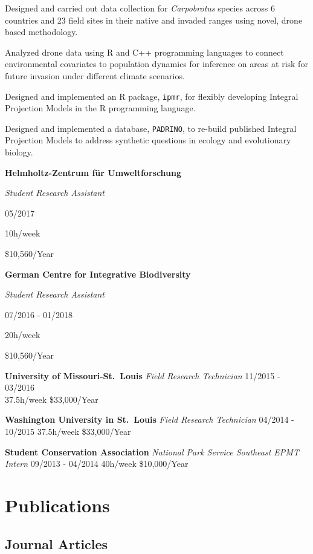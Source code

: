 \documentclass[11pt,]{article}
\renewenvironment{itemize}{
  \begin{list}{}{
    \setlength{\leftmargin}{1.5em}
  }
}{
  \end{list}
}
\begin{document}
\begin{itemize}
\item
  Designed and carried out data collection for \emph{Carpobrotus}
  species across 6 countries and 23 field sites in their native and
  invaded ranges using novel, drone based methodology.
\item
  Analyzed drone data using R and C++ programming languages to connect
  environmental covariates to population dynamics for inference on areas
  at risk for future invasion under different climate scenarios.
\item
  Designed and implemented an R package, \texttt{ipmr}, for flexibly
  developing Integral Projection Models in the R programming language.
\item
  Designed and implemented a database, \texttt{PADRINO}, to re-build
  published Integral Projection Models to address synthetic questions in
  ecology and evolutionary biology.
\end{itemize}

\textbf{Helmholtz-Zentrum für Umweltforschung}

\emph{Student Research Assistant}

05/2017

10h/week

\$10,560/Year

\textbf{German Centre for Integrative Biodiversity}

\emph{Student Research Assistant}

07/2016 - 01/2018

20h/week

\$10,560/Year

\textbf{University of Missouri-St.~Louis} \emph{Field Research
Technician} 11/2015 - 03/2016\\
37.5h/week \$33,000/Year

\textbf{Washington University in St.~Louis} \emph{Field Research
Technician} 04/2014 - 10/2015 37.5h/week \$33,000/Year

\textbf{Student Conservation Association} \emph{National Park Service
Southeast EPMT Intern} 09/2013 - 04/2014 40h/week \$10,000/Year

\hypertarget{publications}{%
\section{Publications}\label{publications}}

\hypertarget{journal-articles}{%
\subsection{Journal Articles}\label{journal-articles}}
\end{document}
